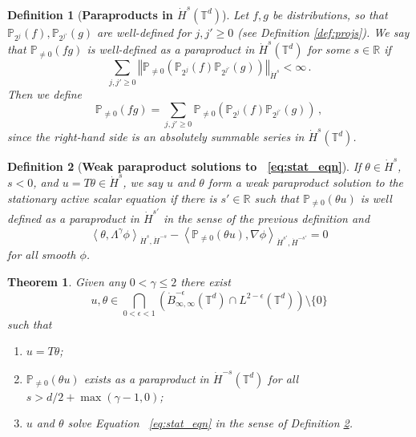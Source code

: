 \documentclass[10pt,a4paper]{amsart}
\newtheorem{definition}{Definition}
\newtheorem{theorem}{Theorem}
\newcommand{\R}{\mathbb R}
\newcommand{\T}{\mathbb T}
\begin{document}
\begin{definition}[\textbf{Paraproducts in $\dot H^s(\T^d)$}]\label{def:paras}
    Let $f,g$ be distributions, so that $\mathbb{P}_{2^j}(f), \mathbb{P}_{2^{j'}}(g)$ are well-defined for $j,j'\geq 0$ (see Definition \ref{def:projs}).  We say that $\mathbb{P}_{\not = 0}(fg)$ is well-defined as a paraproduct in $\dot{H}^s(\T^d)$ for some $s \in \R$ if
    $$
        \sum_{j,j' \geq 0} \left\Vert \mathbb{P}_{\not = 0}\left(\mathbb{P}_{2^j}(f) \mathbb{P}_{2^{j'}}(g)\right) \right\Vert_{\dot{H}^s} < \infty \, .
    $$
    Then we define
    $$
        \mathbb{P}_{\not = 0}(fg) = \sum_{j,j' \geq 0} \mathbb{P}_{\not = 0} \left(\mathbb{P}_{2^j}(f) \mathbb{P}_{2^{j'}}(g)\right) \, ,
    $$
    since the right-hand side is an absolutely summable series in $\dot H^s(\T^d)$.
\end{definition}

\begin{definition}[\textbf{Weak paraproduct solutions to ~\eqref{eq:stat_eqn}}] \label{def:weak_para_soln}
    If $\theta \in \dot{H}^s$, $s < 0$, and $u = T \theta \in \dot{H}^s$, we say $u$ and $\theta$ form a weak paraproduct solution to the stationary active scalar equation if there is $s' \in \R$ such that $\mathbb{P}_{\not = 0}(\theta u)$ is well defined as a paraproduct in $\dot{H}^{s'}$ in the sense of the previous definition and
    $$
        \left\langle \theta, \Lambda^{\gamma} \phi \right\rangle_{\dot{H}^{s},\dot{H}^{-s}} - \left\langle \mathbb{P}_{\not= 0}(\theta u), \nabla \phi \right\rangle_{\dot{H}^{s'}, \dot{H}^{-s'}} = 0
    $$
    for all smooth $\phi$.
\end{definition}

\begin{theorem}\label{thm:main}
    Given any $0 < \gamma \leq 2$ there exist
    $$
    u,\theta \in \bigcap_{0 < \epsilon < 1} \left(\dot{B}_{\infty,\infty}^{-\epsilon}(\T^d) \cap L^{2-\epsilon}(\T^d)\right) \setminus \{0\}
    $$
    such that
    \begin{enumerate}
        \item [(a)] $u = T\theta$;
        \item [(b)] $\mathbb{P}_{\not=0}(\theta u)$ exists as a paraproduct in $\dot{H}^{-s}(\T^d)$ for all $s > d/2 + \max(\gamma - 1, 0)$;
        \item [(c)] $u$ and $\theta$ solve Equation ~\eqref{eq:stat_eqn} in the sense of Definition \ref{def:weak_para_soln}.
    \end{enumerate}
\end{theorem}
\end{document}
